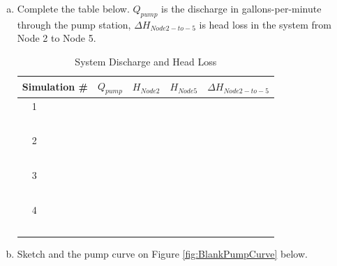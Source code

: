 \documentclass[11pt]{article}
\begin{document}
\begin{enumerate}
\begin{enumerate}[a)]
\item Complete the table below.  $Q_{pump}$ is the discharge in gallons-per-minute through the pump station, $\Delta H_{Node 2 -to- 5}$ is head loss in the system from Node 2 to Node 5.
\begin{table}[htbp]
   \centering
      \caption{System Discharge and Head Loss}
   \begin{tabular}{p{1in} p{1in} p{1in} p{1in} p{1in} } %
Simulation \# & $Q_{pump}$ & $H_{Node2}$ & $H_{Node5}$ & $\Delta H_{Node 2 -to- 5}$ \\
\hline
\hline
~~1 & ~ &~ & ~ & ~ \\
~ & ~ &~ & ~ & ~ \\
\hline
~~2 & ~ &~ & ~ & ~ \\
~ & ~ &~ & ~ & ~ \\
\hline
~~3 & ~ &~ & ~ & ~\\
~ & ~ &~ & ~ & ~ \\
\hline
~~4 & ~ &~ & ~ & ~ \\
~ & ~ &~ & ~ & ~ \\
\hline
   \end{tabular}
   \label{tab:system-curve}
\end{table}
\newpage

\item Sketch and the pump curve on Figure \ref{fig:BlankPumpCurve} below. 


\end{enumerate}
\end{enumerate}
\end{document}
